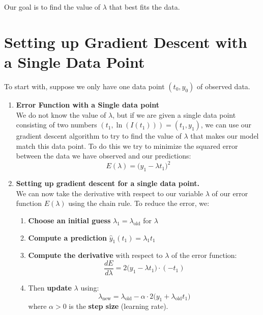 \documentclass[11pt]{article}
\begin{document}
Our goal is to find the value of $\lambda$ that best fits the data.
\section*{Setting up Gradient Descent with a Single Data Point}
To start with, suppose we only have one data point $(t_0,y_0)$ of observed data.
\begin{enumerate}

\item \textbf{Error Function with a Single data point}\\

We do not know the value of $\lambda$, but if we are given a single  data point consisting of two numbers $(t_1,\ln(I(t_1))) = (t_1,y_1)$,
we can use our gradient descent algorithm to try to find the value of $\lambda$ that makes our model match this data point. To do this we try to minimize the squared error between the data we have observed and our predictions:
\[
E(\lambda) = \big(y_1 - \lambda t_1\big)^2
\]
\item \textbf{Setting up gradient descent for a single data point.}\\
    We can now take the derivative with respect to our variable $\lambda$ of our error function $E(\lambda)$ using the chain rule.
    To reduce the error, we:
    \begin{enumerate}
    \item[(a)] \textbf{Choose an initial guess} $\lambda_1 = \lambda_{\text{old}}$ for $\lambda$\\
    \item[(b)] \textbf{Compute a prediction} $\hat{y}_1(t_1) = \lambda_1 t_1$\\

    \item[(c)] \textbf{Compute the derivative} with respect to $\lambda$ of the error function:
    \[
    \frac{dE}{d \lambda} = 2\big(y_1 - \lambda t_1\big) \cdot (-t_1)
    \]
    \item[(d)] Then \textbf{update} $\lambda$ using:
    \[
    \lambda_{\text{new}} = \lambda_{\text{old}} - \alpha \cdot 2\big(y_1 + \lambda_{\text{old}}t_1\big)
    \]
    where $\alpha > 0$ is the \textbf{step size} (learning rate).
    \end{enumerate}
    \vspace{0.5cm}
    

\end{enumerate}
\end{document}
